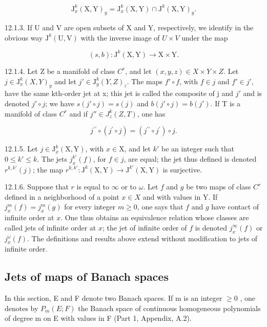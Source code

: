 \[
\mathrm{J} _ {x} ^ {k} (\mathrm{X}, \mathrm{Y}) _ {y} = \mathrm{J} _ {x} ^ {k} (\mathrm{X}, \mathrm{Y}) \cap \mathrm{J} ^ {k} (\mathrm{X}, \mathrm{Y}) _ {y}.
\]

12.1.3. If U and V are open subsets of X and Y, respectively, we identify in the obvious way \(\mathrm{J}^{k}(\mathrm{U},\mathrm{V})\) with the inverse image of \(U \times V\) under the map

\[
(s, b): \mathrm{J} ^ {k} (\mathrm{X}, \mathrm{Y}) \rightarrow \mathrm{X} \times \mathrm{Y}.
\]

12.1.4. Let Z be a manifold of class \(C^{r}\), and let \((x, y, z) \in X \times Y \times Z\). Let \(j \in \mathrm{J}_{x}^{k}(X, Y)_{y}\) and let \(j' \in \mathrm{J}_{y}^{k}(Y, Z)_{z}\). The maps \(f' \circ f\), with \(f \in j\) and \(f' \in j'\), have the same kth-order jet at x; this jet is called the composite of j and \(j'\) and is denoted \(j' \circ j\); we have \(s(j' \circ j) = s(j)\) and \(b(j' \circ j) = b(j')\). If T is a manifold of class \(C^{r}\) and if \(j'' \in J_{z}^{k}(Z, T)\), one has

\[
j ^ {\prime \prime} \circ (j ^ {\prime} \circ j) = (j ^ {\prime \prime} \circ j ^ {\prime}) \circ j.
\]

12.1.5. Let \(j \in \mathrm{J}_x^k(\mathrm{X}, \mathrm{Y})\), with \(x \in \mathrm{X}\), and let \(k'\) be an integer such that \(0 \leqslant k' \leqslant k\). The jets \(j_x^{k'}(f)\), for \(f \in j\), are equal; the jet thus defined is denoted \(r^{k, k'}(j)\); the map \(r^{k, k'}: \mathrm{J}^k(\mathrm{X}, \mathrm{Y}) \to \mathrm{J}^{k'}(\mathrm{X}, \mathrm{Y})\) is surjective.

12.1.6. Suppose that \(r\) is equal to \(\infty\) or to \(\omega\). Let \(f\) and \(g\) be two maps of class \(C^{r}\) defined in a neighborhood of a point \(x \in X\) and with values in Y. If \(j_x^m(f) = j_x^m(g)\) for every integer \(m \geqslant 0\), one says that \(f\) and \(g\) have contact of infinite order at \(x\). One thus obtains an equivalence relation whose classes are called jets of infinite order at \(x\); the jet of infinite order of \(f\) is denoted \(j_x^\infty(f)\) or \(j_x^\omega(f)\). The definitions and results above extend without modification to jets of infinite order.

\subsection{Jets of maps of Banach spaces}

In this section, E and F denote two Banach spaces. If m is an integer \(\geqslant0\) , one denotes by \(P_{m}(E;F)\) the Banach space of continuous homogeneous polynomials of degree m on E with values in F (Part 1, Appendix, A.2).

